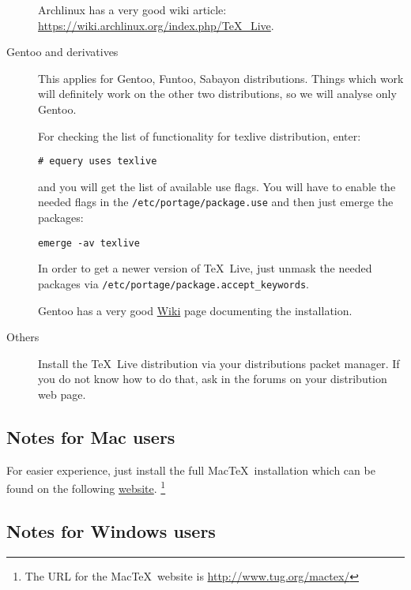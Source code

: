 \documentclass[a4paper]{article}
\newcommand{\MacTeX}{Mac\TeX}
\begin{document}
\begin{description}
        Archlinux has a very good wiki article:
        \url{https://wiki.archlinux.org/index.php/TeX_Live}.
        
    \item[Gentoo and derivatives]
        This applies for Gentoo, Funtoo, Sabayon distributions. Things which
        work will definitely work on the other two distributions, so we will
        analyse only Gentoo.

        For checking the list of functionality for texlive distribution, enter:
\begin{lstlisting}
# equery uses texlive
\end{lstlisting}
        and you will get the list of available use flags.
        You will have to enable the needed flags in the
        \verb|/etc/portage/package.use| and then just emerge the packages:
\begin{lstlisting}
emerge -av texlive
\end{lstlisting}
        In order to get a newer version of \TeX\ Live, just unmask the needed
        packages via \verb|/etc/portage/package.accept_keywords|.

        Gentoo has a very good
        \href{http://www.gentoo.org/proj/en/tex/texlive-migration-guide.xml}{Wiki}
        page documenting the installation.
    \item[Others]
        Install the \TeX\ Live distribution via your distributions packet
        manager. If you do not know how to do that, ask in the forums on your
        distribution web page.
\end{description}

\subsection{Notes for Mac users}

For easier experience, just install the full \MacTeX\ installation which can be
found on the following \href{http://www.tug.org/mactex/}{website}.
\footnote{The URL for the \MacTeX\ website is \url{http://www.tug.org/mactex/}}

\subsection{Notes for Windows users}
\end{document}
